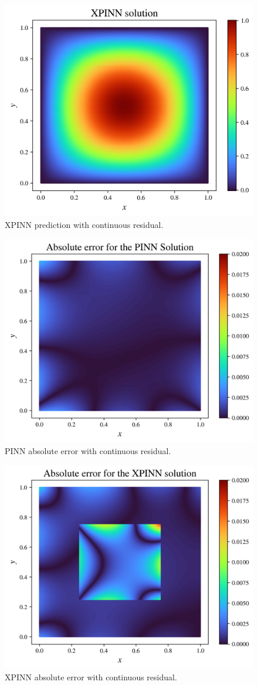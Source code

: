 \begin{figure}[h]
    \centering
    \includegraphics[width=0.7\linewidth]{Project1XPINNs/figures/Poisson/smooth_xpinn_Poisson_solution.png}
    \caption{XPINN prediction with continuous residual.}
    \label{fig:xpinn_smooth_pred}
\end{figure}

\begin{figure}[h]
    \centering
    \includegraphics[width=0.7\linewidth]{Project1XPINNs/figures/Poisson/smooth_single_Poisson_error.png}
    \caption{PINN absolute error with continuous residual.}
    \label{fig:pinn_smooth_error}
\end{figure}

\begin{figure}[h]
    \centering
    \includegraphics[width=0.7\linewidth]{Project1XPINNs/figures/Poisson/smooth_xpinn_Poisson_error.png}
    \caption{XPINN absolute error with continuous residual.}
    \label{fig:xpinn_smooth_error}
\end{figure}

